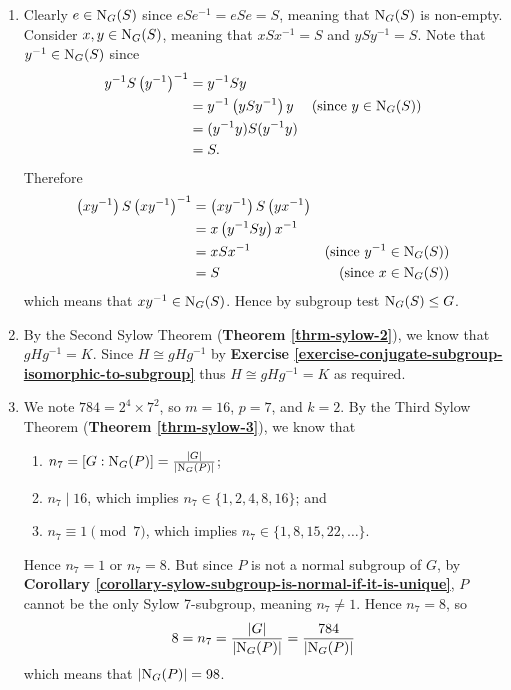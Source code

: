 \begin{enumerate}
    \item Clearly $e \in \mathrm{N}_{G}(S)$ since $eSe^{-1} = eSe = S$, meaning that $\mathrm{N}_{G}(S)$ is non-empty. Consider $x, y \in \mathrm{N}_{G}(S)$, meaning that $xSx^{-1} = S$ and $ySy^{-1} = S$. Note that $y^{-1} \in \mathrm{N}_{G}(S)$ since
    \begin{align*}
        y^{-1}S\left(y^{-1}\right)^{-1} &= y^{-1}Sy\\
        &= y^{-1}\left(ySy^{-1}\right)y & \text{(since } y \in \mathrm{N}_{G}(S))\\
        &= (y^{-1}y)S(y^{-1}y)\\
        &= S.
    \end{align*}
    Therefore
    \begin{align*}
        \left(xy^{-1}\right)S\left(xy^{-1}\right)^{-1} &= \left(xy^{-1}\right)S\left(yx^{-1}\right)\\
        &= x\left(y^{-1}Sy\right)x^{-1}\\
        &= xSx^{-1} & \text{(since } y^{-1} \in \mathrm{N}_{G}(S))\\
        &= S & \text{(since } x \in \mathrm{N}_{G}(S))
    \end{align*}
    which means that $xy^{-1} \in \mathrm{N}_{G}(S)$. Hence by subgroup test $\mathrm{N}_{G}(S) \leq G$.

    \item By the Second Sylow Theorem (\textbf{Theorem \ref{thrm-sylow-2}}), we know that $gHg^{-1} = K$. Since $H \cong gHg^{-1}$ by \textbf{Exercise \ref{exercise-conjugate-subgroup-isomorphic-to-subgroup}} thus $H \cong gHg^{-1} = K$ as required.

    \item We note $784 = 2^4 \times 7^2$, so $m = 16$, $p = 7$, and $k = 2$. By the Third Sylow Theorem (\textbf{Theorem \ref{thrm-sylow-3}}), we know that
    \begin{enumerate}
        \item $n_7 = [G : \mathrm{N}_{G}(P)] = \frac{|G|}{|\mathrm{N}_{G}(P)|}$;
        \item $n_7 \mid 16$, which implies $n_7 \in \{1, 2, 4, 8, 16\}$; and
        \item $n_7 \equiv 1 \pmod 7$, which implies $n_7 \in \{1, 8, 15, 22, \dots\}$.
    \end{enumerate}
    Hence $n_7 = 1$ or $n_7 = 8$. But since $P$ is not a normal subgroup of $G$, by \textbf{Corollary \ref{corollary-sylow-subgroup-is-normal-if-it-is-unique}}, $P$ cannot be the only Sylow 7-subgroup, meaning $n_7 \neq 1$. Hence $n_7 = 8$, so
    \[
        8 = n_7 = \frac{|G|}{|\mathrm{N}_{G}(P)|} = \frac{784}{|\mathrm{N}_{G}(P)|}
    \]
    which means that $|\mathrm{N}_{G}(P)| = 98$.


\end{enumerate}
